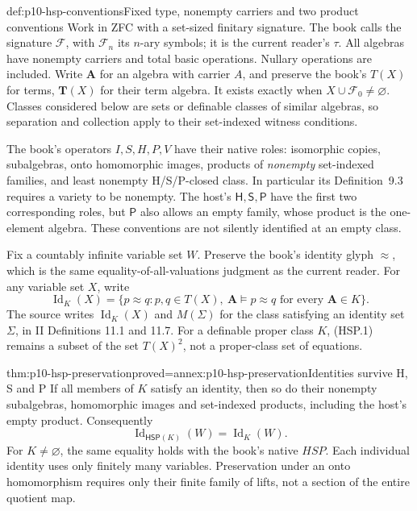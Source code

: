 \begin{hbconvention}{def:p10-hsp-conventions}{Fixed type, nonempty carriers and two product conventions}
Work in ZFC with a set-sized finitary signature.
The book calls the signature \(\mathcal F\), with \(\mathcal F_n\) its \(n\)-ary
symbols; it is the current reader's \(\tau\).
All algebras have nonempty carriers and total basic operations.
Nullary operations are included. Write \(\mathbf A\) for
an algebra with carrier \(A\), and preserve the book's
\(T(X)\) for terms, \(\mathbf T(X)\) for their term algebra.
It exists exactly when \(X\cup \mathcal F_0\ne\varnothing\).
Classes considered below are sets or definable classes of similar
algebras, so separation and collection apply to their set-indexed
witness conditions.

The book's operators \(I,S,H,P,V\) have their native roles:
isomorphic copies, subalgebras, onto homomorphic images,
products of \emph{nonempty} set-indexed families, and least
nonempty H/S/P-closed class.
In particular its Definition~9.3 requires a variety to be nonempty.
The host's \(\mathsf H,\mathsf S,\mathsf P\) have the first
two corresponding roles, but \(\mathsf P\) also allows an
empty family, whose product is the one-element algebra.
These conventions are not silently identified at an empty class.

Fix a countably infinite variable set \(W\).
Preserve the book's identity glyph \(\approx\), which is the
same equality-of-all-valuations judgment as the current reader.
For any variable set \(X\), write
\[
 \operatorname{Id}_K(X)=
 \{p\approx q:p,q\in T(X),\
       \mathbf A\models p\approx q\text{ for every }\mathbf A\in K\}.
 \tag{HSP.1}
\]
The source writes \(\operatorname{Id}_K(X)\) and
\(M(\Sigma)\) for the class satisfying an identity set
\(\Sigma\), in II Definitions 11.1 and 11.7.
For a definable proper class \(K\), (HSP.1) remains a subset of
the set \(T(X)^2\), not a proper-class set of equations.
\end{hbconvention}

\begin{hblemma}{thm:p10-hsp-preservation}{proved=annex:p10-hsp-preservation}{Identities survive H, S and P}
If all members of \(K\) satisfy an identity, then so do their
nonempty subalgebras, homomorphic images and set-indexed
products, including the host's empty product.
Consequently
\[
 \operatorname{Id}_{\mathsf H\mathsf S\mathsf P(K)}(W)
       =\operatorname{Id}_K(W).
 \tag{HSP.2}
\]
For \(K\ne\varnothing\), the same equality holds with the book's
native \(HSP\). Each individual identity uses only finitely
many variables. Preservation under an onto homomorphism requires
only their finite family of lifts, not a section of the entire
quotient map.
\end{hblemma}

